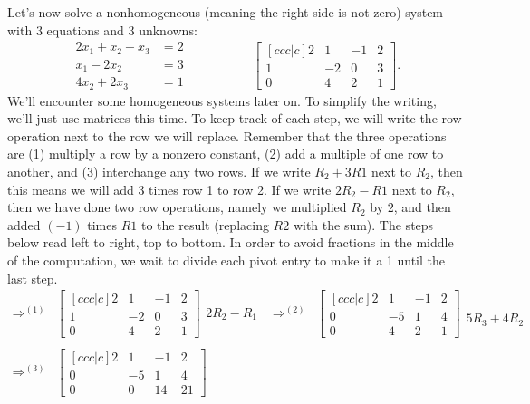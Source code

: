 \begin{example}
Let's now solve a nonhomogeneous (meaning the right side is not zero) system with 3 equations and 3 unknowns: $$\begin{array}{rl}
2x_1+x_2-x_3&=2\\
x_1-2x_2 &=3\\
4x_2+2x_3&=1
\end{array} \quad\quad\quad\quad\quad
\begin{bmatrix}[ccc|c] 2&1&-1&2\\1&-2&0&3\\0&4&2&1\end{bmatrix}.$$
We'll encounter some homogeneous systems later on.  To simplify the
writing, we'll just use matrices this time.  To keep track of each
step, we will write the row operation next to the row we will replace.
Remember that the three operations are (1) multiply a row by a nonzero
constant, (2) add a multiple of one row to another, and (3)
interchange any two rows.  If we write $R_2+3R1$ next to $R_2$, then
this means we will add 3 times row 1 to row 2.  If we write $2R_2-R1$
next to $R_2$, then we have done two row operations, namely we
multiplied $R_2$ by $2$, and then added $(-1)$ times $R1$ to the result
(replacing $R2$ with the sum).  The steps below read left to right,
top to bottom.  In order to avoid fractions in the middle of the
computation, we wait to divide each pivot entry to make it a 1 until
the last step.
$$\begin{array}{rlcl}
\Rightarrow^{(1)}&
 \begin{bmatrix}[ccc|c] 2&1&-1&2\\1&-2&0&3\\0&4&2&1\end{bmatrix}
  \begin{array}{lr} \ \\2R_2-R_1\\ \ \end{array}
&\Rightarrow^{(2)}& 
\begin{bmatrix}[ccc|c] 2&1&-1&2\\0&-5&1&4\\0&4&2&1\end{bmatrix} 
\begin{array}{lr}\ \\ \ \\5R_3+4R_2 \end{array}
\\ \\ \Rightarrow^{(3)}&
 \begin{bmatrix}[ccc|c] 2&1&-1&2\\0&-5&1&4\\0&0&14&21\end{bmatrix} 

\end{array}$$
\end{example}
